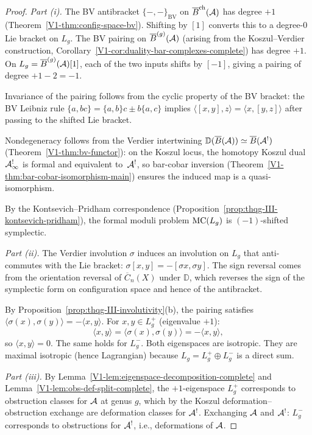 \begin{proof}
\emph{Part (i).}
The BV antibracket $\{-, -\}_{\mathrm{BV}}$ on
$\overline{B}^{\mathrm{ch}}(\mathcal{A})$ has degree $+1$
(Theorem~\ref{V1-thm:config-space-bv}). Shifting by $[1]$
converts this to a degree-$0$ Lie bracket on $L_g$.
The BV pairing on $\overline{B}^{(g)}(\mathcal{A})$ (arising from the
Koszul--Verdier construction,
Corollary~\ref{V1-cor:duality-bar-complexes-complete}) has degree
$+1$. On $L_g = \overline{B}^{(g)}(\mathcal{A})[1]$, each of the two inputs
shifts by $[-1]$, giving a pairing of degree
$+1 - 2 = -1$.

Invariance of the pairing follows from the cyclic property of
the BV bracket: the BV Leibniz rule
$\{a, bc\} = \{a, b\}c \pm b\{a, c\}$ implies
$\langle [x, y], z \rangle = \langle x, [y, z] \rangle$
after passing to the shifted Lie bracket.

Nondegeneracy follows from the Verdier intertwining
$\mathbb{D}(\overline{B}(\mathcal{A})) \simeq \overline{B}(\mathcal{A}^!)$
(Theorem~\ref{V1-thm:bv-functor}): on the Koszul locus, the homotopy
Koszul dual~$\mathcal{A}^!_\infty$ is formal and equivalent to~$\mathcal{A}^!$, so
bar-cobar inversion (Theorem~\ref*{V1-thm:bar-cobar-isomorphism-main})
ensures the induced map is a quasi-isomorphism.

By the Kontsevich--Pridham correspondence
(Proposition~\ref{prop:thqg-III-kontsevich-pridham}),
the formal moduli problem $\mathrm{MC}(L_g)$ is $(-1)$-shifted
symplectic.

\emph{Part (ii).}
The Verdier involution $\sigma$ induces an involution on $L_g$
that anti-commutes with the Lie bracket:
$\sigma[x, y] = -[\sigma x, \sigma y]$.
The sign reversal comes from the orientation reversal of
$\overline{C}_n(X)$ under $\mathbb{D}$, which reverses the
sign of the symplectic form on configuration space and hence
of the antibracket.

By Proposition~\ref{prop:thqg-III-involutivity}(b), the pairing
satisfies $\langle \sigma(x), \sigma(y) \rangle = -\langle x, y
\rangle$. For $x, y \in L_g^+$ (eigenvalue $+1$):
\[
\langle x, y \rangle
= \langle \sigma(x), \sigma(y) \rangle
= -\langle x, y \rangle,
\]
so $\langle x, y \rangle = 0$. The same holds for $L_g^-$.
Both eigenspaces are isotropic. They are maximal isotropic
(hence Lagrangian) because $L_g = L_g^+ \oplus L_g^-$ is a
direct sum.

\emph{Part (iii).}
By Lemma~\ref{V1-lem:eigenspace-decomposition-complete} and
Lemma~\ref{V1-lem:obs-def-split-complete}, the $+1$-eigenspace
$L_g^+$ corresponds to obstruction classes for $\mathcal{A}$ at
genus $g$, which by the Koszul deformation--obstruction exchange
are deformation classes for $\mathcal{A}^!$. Exchanging $\mathcal{A}$ and
$\mathcal{A}^!$: $L_g^-$ corresponds to obstructions for $\mathcal{A}^!$, i.e.,
deformations of $\mathcal{A}$.
\end{proof}

